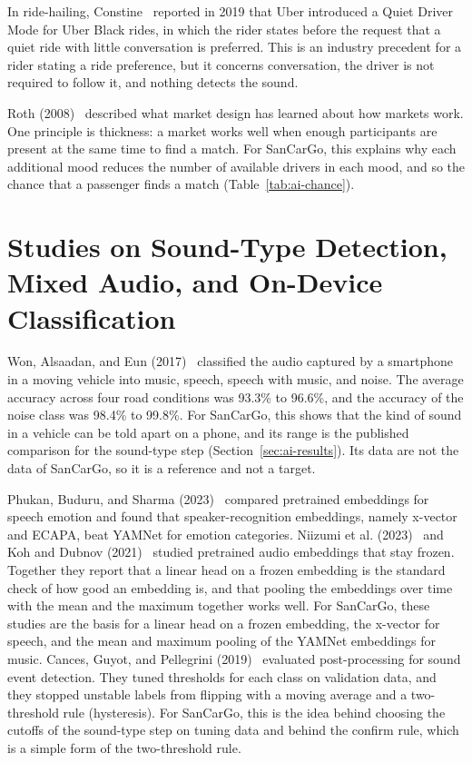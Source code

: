 In ride-hailing, Constine~\cite{constine2019uber} reported in 2019 that Uber introduced a Quiet Driver Mode for Uber Black rides, in which the rider states before the request that a quiet ride with little conversation is preferred. This is an industry precedent for a rider stating a ride preference, but it concerns conversation, the driver is not required to follow it, and nothing detects the sound.

Roth (2008)~\cite{roth2008market} described what market design has learned about how markets work. One principle is thickness: a market works well when enough participants are present at the same time to find a match. For SanCarGo, this explains why each additional mood reduces the number of available drivers in each mood, and so the chance that a passenger finds a match (Table~\ref{tab:ai-chance}).

\section{Studies on Sound-Type Detection, Mixed Audio, and On-Device Classification}
\label{sec:lit-ondevice}
Won, Alsaadan, and Eun (2017)~\cite{won2017adaptive} classified the audio captured by a smartphone in a moving vehicle into music, speech, speech with music, and noise. The average accuracy across four road conditions was 93.3\% to 96.6\%, and the accuracy of the noise class was 98.4\% to 99.8\%. For SanCarGo, this shows that the kind of sound in a vehicle can be told apart on a phone, and its range is the published comparison for the sound-type step (Section~\ref{sec:ai-results}). Its data are not the data of SanCarGo, so it is a reference and not a target.

Phukan, Buduru, and Sharma (2023)~\cite{phukan2023embeddings} compared pretrained embeddings for speech emotion and found that speaker-recognition embeddings, namely x-vector and ECAPA, beat YAMNet for emotion categories. Niizumi et al. (2023)~\cite{niizumi2023byola} and Koh and Dubnov (2021)~\cite{koh2021embeddings} studied pretrained audio embeddings that stay frozen. Together they report that a linear head on a frozen embedding is the standard check of how good an embedding is, and that pooling the embeddings over time with the mean and the maximum together works well. For SanCarGo, these studies are the basis for a linear head on a frozen embedding, the x-vector for speech, and the mean and maximum pooling of the YAMNet embeddings for music. Cances, Guyot, and Pellegrini (2019)~\cite{cances2019postprocessing} evaluated post-processing for sound event detection. They tuned thresholds for each class on validation data, and they stopped unstable labels from flipping with a moving average and a two-threshold rule (hysteresis). For SanCarGo, this is the idea behind choosing the cutoffs of the sound-type step on tuning data and behind the confirm rule, which is a simple form of the two-threshold rule.

